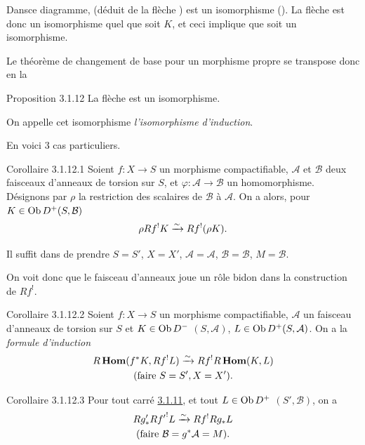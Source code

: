 \documentclass[10pt]{../fichiers-configuration-latex/smfart}
\begin{document}
Dans\pageoriginale ce diagramme,  (déduit de la flèche
) est un isomorphisme (). La
flèche  
est donc un isomorphisme quel que soit $K$, et ceci implique que
 soit un isomorphisme.

Le théorème de changement de base pour un morphisme propre se
transpose donc en la 

\begin{enonce*}{Proposition 3.1.12}
La flèche  est un isomorphisme.
\end{enonce*}

On appelle cet isomorphisme \emph{l'isomorphisme d'induction}.

En voici 3 cas particuliers.

\begin{enonce*}{Corollaire 3.1.12.1}
Soient $f:X\rightarrow S$ un morphisme compactifiable, $\mathcal{A}$
et $\mathcal{B}$ deux faisceaux d'anneaux de torsion sur $S$, et
$\varphi:\mathcal{A}\rightarrow \mathcal{B}$ un
homomorphisme. Désignons par $\rho$ la restriction des scalaires de
$\mathcal{B}$ à $\mathcal{A}$. On a alors, pour $K\in \operatorname{Ob}
D^{+}(S,\mathcal{B})$
$$
\rho Rf^{!}K\xrightarrow{\sim} Rf^{!}(\rho K){}.
$$
\end{enonce*}

Il suffit dans  de prendre $S=S'$, $X=X'$,
$\mathcal{A}=\mathcal{A}$, $\mathcal{B}=\mathcal{B}$, $M=\mathcal{B}$.

On voit donc que le faisceau d'anneaux joue un rôle bidon dans la
construction de $Rf^{!}$.

\begin{enonce*}{Corollaire 3.1.12.2}
Soient $f:X\rightarrow S$ un morphisme compactifiable, $\mathcal{A}$
un faisceau d'anneaux de torsion sur $S$ et $K\in \operatorname{Ob} D^{-}$
$(S,\mathcal{A})$, $L\in \operatorname{Ob} D^{+}(S,\mathcal{A})$. On a la \emph{formule
d'induction}
\begin{gather*}
R\operatorname{\mathbf{Hom}}(f^{\ast}K,Rf^{!}L)\xrightarrow{\sim} Rf^{!}R\operatorname{\mathbf{Hom}}(K,L)\\
(\text{\rm faire } S=S', X=X'){}.
\end{gather*}
\end{enonce*}

\begin{enonce*}{Corollaire 3.1.12.3}
Pour tout carré \hyperref[XVIII.subsubsec3.1.11]{3.1.11}, et tout $L\in \operatorname{Ob} D^{+}$
$(S',\mathcal{B})$, on a
\begin{gather*}
Rg'_{\ast}R{f'}^{!}L\xrightarrow{\sim} Rf^{!}Rg_{\ast}L\\
(\text{\rm faire } \mathcal{B}=g^{\ast}\mathcal{A}=M){}. 
\end{gather*}
\end{enonce*}
\end{document}
